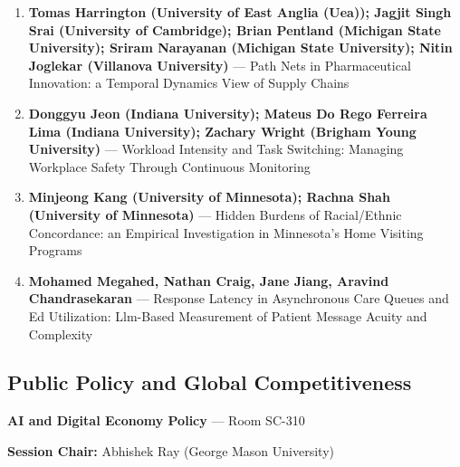 \documentclass[
  10pt,
  letterpaper,
  DIV=11,
  numbers=noendperiod]{scrartcl}
\begin{document}
\begin{enumerate}
\def\labelenumi{\arabic{enumi}.}
\item
  \textbf{Tomas Harrington (University of East Anglia (Uea)); Jagjit
  Singh Srai (University of Cambridge); Brian Pentland (Michigan State
  University); Sriram Narayanan (Michigan State University); Nitin
  Joglekar (Villanova University)} --- Path Nets in Pharmaceutical
  Innovation: a Temporal Dynamics View of Supply Chains
\item
  \textbf{Donggyu Jeon (Indiana University); Mateus Do Rego Ferreira
  Lima (Indiana University); Zachary Wright (Brigham Young University)}
  --- Workload Intensity and Task Switching: Managing Workplace Safety
  Through Continuous Monitoring
\item
  \textbf{Minjeong Kang (University of Minnesota); Rachna Shah
  (University of Minnesota)} --- Hidden Burdens of Racial/Ethnic
  Concordance: an Empirical Investigation in Minnesota's Home Visiting
  Programs
\item
  \textbf{Mohamed Megahed, Nathan Craig, Jane Jiang, Aravind
  Chandrasekaran} --- Response Latency in Asynchronous Care Queues and
  Ed Utilization: Llm-Based Measurement of Patient Message Acuity and
  Complexity
\end{enumerate}

\subsection{\texorpdfstring{\textcolor{policy}{Public Policy and Global Competitiveness}}{}}\label{section-45}

\textbf{AI and Digital Economy Policy} --- Room SC-310

\textbf{Session Chair:} Abhishek Ray (George Mason University)
\end{document}
